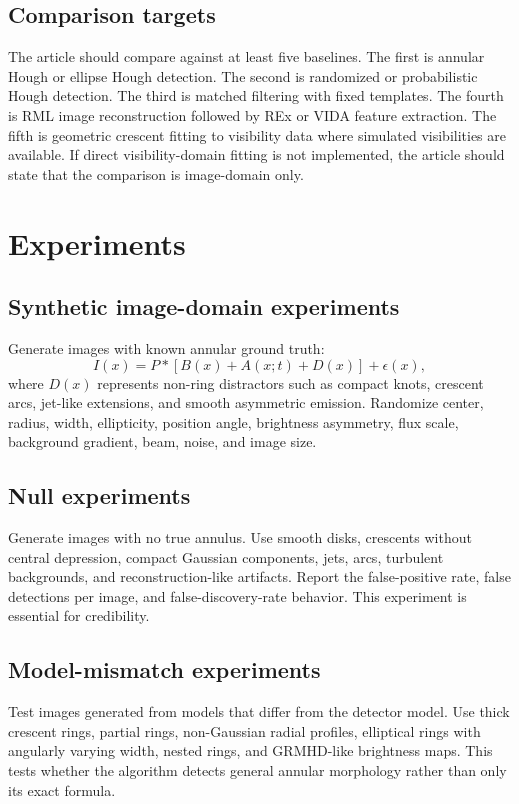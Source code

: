 \documentclass[11pt]{article}
\begin{document}
\subsection{Comparison targets}
The article should compare against at least five baselines. The first is annular Hough or ellipse Hough detection. The second is randomized or probabilistic Hough detection. The third is matched filtering with fixed templates. The fourth is RML image reconstruction followed by REx or VIDA feature extraction. The fifth is geometric crescent fitting to visibility data where simulated visibilities are available. If direct visibility-domain fitting is not implemented, the article should state that the comparison is image-domain only.

\section{Experiments}

\subsection{Synthetic image-domain experiments}
Generate images with known annular ground truth:
\begin{equation}
    I(x)=P\ast\left[B(x)+A(x;t) + D(x)\right]+\epsilon(x),
\end{equation}
where $D(x)$ represents non-ring distractors such as compact knots, crescent arcs, jet-like extensions, and smooth asymmetric emission. Randomize center, radius, width, ellipticity, position angle, brightness asymmetry, flux scale, background gradient, beam, noise, and image size.

\subsection{Null experiments}
Generate images with no true annulus. Use smooth disks, crescents without central depression, compact Gaussian components, jets, arcs, turbulent backgrounds, and reconstruction-like artifacts. Report the false-positive rate, false detections per image, and false-discovery-rate behavior. This experiment is essential for credibility.

\subsection{Model-mismatch experiments}
Test images generated from models that differ from the detector model. Use thick crescent rings, partial rings, non-Gaussian radial profiles, elliptical rings with angularly varying width, nested rings, and GRMHD-like brightness maps. This tests whether the algorithm detects general annular morphology rather than only its exact formula.
\end{document}
